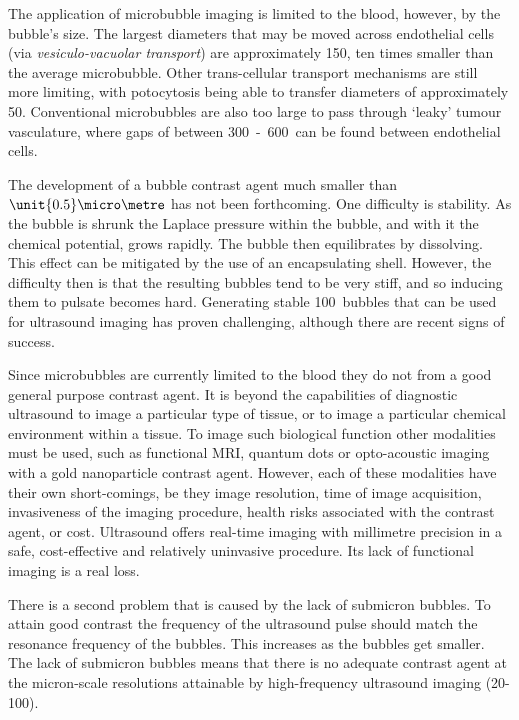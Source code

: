The application of microbubble imaging is limited to the blood, however, by the bubble's size.
The largest diameters that may be  moved across endothelial cells (via {\em vesiculo-vacuolar transport}) are approximately \unit{150}\nano\metre\cite{Hobbs1998},
ten times smaller than the average microbubble.
Other trans-cellular transport mechanisms are still more limiting,
with potocytosis being able to transfer diameters of approximately \unit{50}\nano\metre\cite{Anderson1993,Khalil2006}.
Conventional microbubbles are also too large to pass through `leaky' tumour vasculature, where gaps of between \unit{300-600}\nano\metre\ can be found between endothelial 
cells\cite{Fukumori2006, Hashizume2000,  Hobbs1998}.


The development of a bubble contrast agent much smaller than $\unit{0.5}\micro\metre$ has not been forthcoming.
One difficulty is stability.
As the bubble is shrunk the  Laplace pressure within the bubble, and with it the chemical potential, 
grows rapidly.
The bubble then equilibrates  by dissolving.
This effect can be mitigated by the use of an encapsulating shell\cite{Ferrara2007}.
However, the difficulty then is that the resulting bubbles tend to be very stiff, 
and so inducing them to pulsate becomes hard\cite{Bloch2005,Zhanwen2010,Borkent2007}.
Generating stable \unit{100}\nano\metre\  bubbles that can be used for ultrasound imaging has proven challenging,
although there are recent signs of success\cite{Zhanwen2010, Weijs2012}.

Since microbubbles are currently limited to the blood 
they do not from a good general purpose contrast agent.
It is beyond the capabilities of diagnostic ultrasound
to image a particular type of tissue,
or to image a particular chemical environment within a tissue.
To image such biological function other modalities must be used,
such as  
functional MRI\cite{Lanza2004a},
quantum dots\cite{Ballou2004} or
opto-acoustic imaging with a gold nanoparticle contrast agent\cite{Copland2004}.
However, each of these modalities have their own short-comings,
be they image resolution, time of image acquisition, 
invasiveness of the imaging procedure, 
health risks associated with the contrast agent,
or cost.
Ultrasound offers real-time imaging with millimetre precision
in a safe, cost-effective and relatively uninvasive procedure.
Its lack of functional imaging is a real loss.

There is a second problem that is caused by the lack of submicron bubbles.
To attain good contrast the frequency of the ultrasound pulse should match
the resonance frequency of the bubbles.
This increases as the bubbles get smaller\cite{Zheng2006}.
The lack of submicron bubbles means that there is no adequate contrast agent at the micron-scale resolutions attainable by high-frequency ultrasound imaging (20-\unit{100}\mega\hertz).

